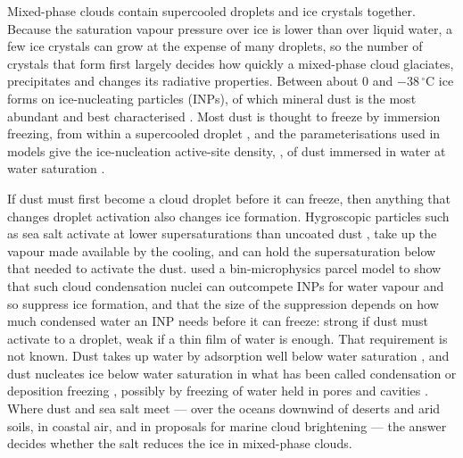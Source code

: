 
\introduction

Mixed-phase clouds contain supercooled droplets and ice crystals together. Because the saturation vapour pressure over ice is lower than over liquid water, a few ice crystals can grow at the expense of many droplets, so the number of crystals that form first largely decides how quickly a mixed-phase cloud glaciates, precipitates and changes its radiative properties. Between about $0$ and $-38\,^\circ$C ice forms on ice-nucleating particles (INPs), of which mineral dust is the most abundant and best characterised \citep{Hoose2012,Murray2012,Kanji2017}. Most dust is thought to freeze by immersion freezing, from within a supercooled droplet \citep{Vali2015}, and the parameterisations used in models give the ice-nucleation active-site density, \ns, of dust immersed in water at water saturation \citep{Niemand2012,Ullrich2017}.

If dust must first become a cloud droplet before it can freeze, then anything that changes droplet activation also changes ice formation. Hygroscopic particles such as sea salt activate at lower supersaturations than uncoated dust \citep{Kumar2011}, take up the vapour made available by the cooling, and can hold the supersaturation below that needed to activate the dust. \citet{Simpson2018} used a bin-microphysics parcel model to show that such cloud condensation nuclei can outcompete INPs for water vapour and so suppress ice formation, and that the size of the suppression depends on how much condensed water an INP needs before it can freeze: strong if dust must activate to a droplet, weak if a thin film of water is enough. That requirement is not known. Dust takes up water by adsorption well below water saturation \citep{Kumar2009,Kumar2011}, and dust nucleates ice below water saturation in what has been called condensation or deposition freezing \citep{Moehler2006,Field2006,Hoose2012}, possibly by freezing of water held in pores and cavities \citep{Marcolli2014}. Where dust and sea salt meet --- over the oceans downwind of deserts and arid soils, in coastal air, and in proposals for marine cloud brightening \citep{Connolly2014} --- the answer decides whether the salt reduces the ice in mixed-phase clouds.

